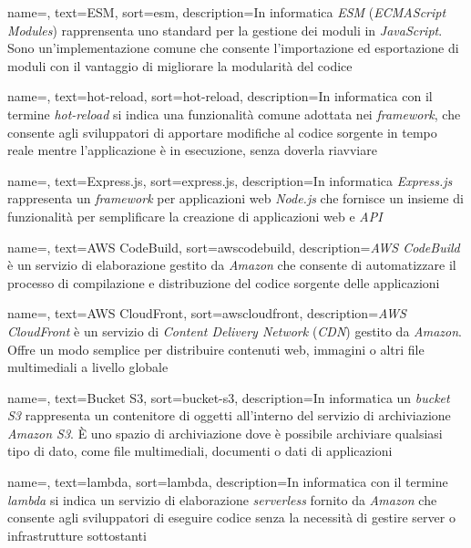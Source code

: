  {
    name=,
    text=ESM,
    sort=esm,
    description={In informatica \emph{ESM} (\emph{ECMAScript Modules}) rapprensenta uno standard per la gestione dei moduli in \emph{JavaScript}. Sono un'implementazione comune che consente l'importazione
    ed esportazione di moduli con il vantaggio di migliorare la modularità del codice}
}

 {
    name=,
    text=hot-reload,
    sort=hot-reload,
    description={In informatica con il termine \emph{hot-reload} si indica una funzionalità comune adottata nei \emph{framework}, che consente agli sviluppatori di apportare modifiche al codice sorgente
    in tempo reale mentre l'applicazione è in esecuzione, senza doverla riavviare}
}

 {
    name=,
    text=Express.js,
    sort=express.js,
    description={In informatica \emph{Express.js} rappresenta un \emph{framework} per applicazioni web \emph{Node.js} che fornisce un insieme di funzionalità per semplificare la creazione di applicazioni web e \emph{API}}
}


 {
    name=,
    text=AWS CodeBuild,
    sort=awscodebuild,
    description={\emph{AWS CodeBuild} è un servizio di elaborazione gestito da \emph{Amazon} che consente di automatizzare il processo di compilazione e distribuzione del codice sorgente delle applicazioni}
}

 {
    name=,
    text=AWS CloudFront,
    sort=awscloudfront,
    description={\emph{AWS CloudFront} è un servizio di \emph{Content Delivery Network} (\emph{CDN}) gestito da \emph{Amazon}. Offre un modo semplice per distribuire contenuti web, immagini o altri file multimediali a livello globale}
}

 {
    name=,
    text=Bucket S3,
    sort=bucket-s3,
    description={In informatica un \emph{bucket S3} rappresenta un contenitore di oggetti all'interno del servizio di archiviazione \emph{Amazon S3}. È uno spazio di archiviazione dove è possibile archiviare qualsiasi tipo di dato, come file multimediali, documenti o dati di applicazioni}
}

 {
    name=,
    text=lambda,
    sort=lambda,
    description={In informatica con il termine \emph{lambda} si indica un servizio di elaborazione \emph{serverless} fornito da \emph{Amazon} che consente agli sviluppatori di eseguire codice senza la necessità di gestire server o infrastrutture sottostanti}
}

